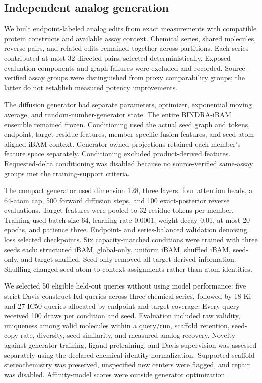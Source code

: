 \documentclass[12pt,a4paper]{article}
\begin{document}
\subsection*{Independent analog generation}
We built endpoint-labeled analog edits from exact measurements with compatible protein constructs and available assay context. Chemical series, shared molecules, reverse pairs, and related edits remained together across partitions. Each series contributed at most 32 directed pairs, selected deterministically. Exposed evaluation components and graph failures were excluded and recorded. Source-verified assay groups were distinguished from proxy comparability groups; the latter do not establish measured potency improvements.

The diffusion generator had separate parameters, optimizer, exponential moving average, and random-number-generator state. The entire BINDRA-iBAM ensemble remained frozen. Conditioning used the actual seed graph and tokens, endpoint, target residue features, member-specific fusion features, and seed-atom-aligned iBAM context. Generator-owned projections retained each member's feature space separately. Conditioning excluded product-derived features. Requested-delta conditioning was disabled because no source-verified same-assay groups met the training-support criteria.

The compact generator used dimension 128, three layers, four attention heads, a 64-atom cap, 500 forward diffusion steps, and 100 exact-posterior reverse evaluations. Target features were pooled to 32 residue tokens per member. Training used batch size 64, learning rate 0.0001, weight decay 0.01, at most 20 epochs, and patience three. Endpoint- and series-balanced validation denoising loss selected checkpoints. Six capacity-matched conditions were trained with three seeds each: structured iBAM, global-only, uniform iBAM, shuffled iBAM, seed-only, and target-shuffled. Seed-only removed all target-derived information. Shuffling changed seed-atom-to-context assignments rather than atom identities.

We selected 50 eligible held-out queries without using model performance: five strict Davis-construct Kd queries across three chemical series, followed by 18 Ki and 27 IC50 queries allocated by endpoint and target coverage. Every query received 100 draws per condition and seed. Evaluation included raw validity, uniqueness among valid molecules within a query/run, scaffold retention, seed-copy rate, diversity, seed similarity, and measured-analog recovery. Novelty against generator training, ligand pretraining, and Davis supervision was assessed separately using the declared chemical-identity normalization. Supported scaffold stereochemistry was preserved, unspecified new centers were flagged, and repair was disabled. Affinity-model scores were outside generator optimization.
\end{document}
